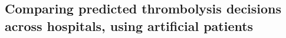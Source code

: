 



\subsection{Comparing predicted thrombolysis decisions across hospitals, using artificial patients}

